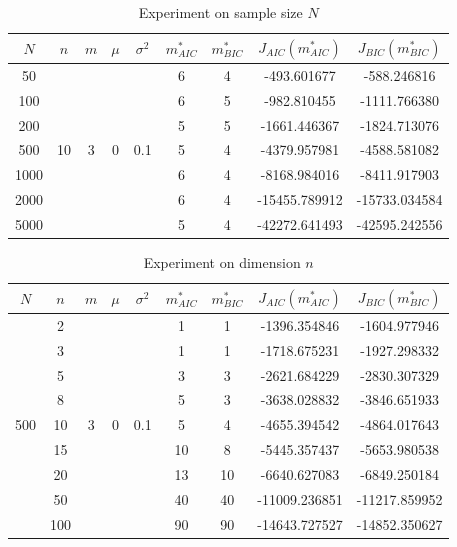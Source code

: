 \documentclass{article}
\begin{document}
\begin{table}[htbp]
	\centering
	\newcommand{\tabincell}[2]{\begin{tabular}{@{}#1@{}}#2\end{tabular}}
	\renewcommand\arraystretch{1.0}
	\caption{Experiment on sample size $N$}
	\label{N}%
	\begin{tabular}{c|c|c|c|c|c|c|c|c}
    $N$ & $n$ & $m$ & $\mu$ & $\sigma^2$ & $m^*_{AIC}$ & $m^*_{BIC}$ & $J_{AIC}(m^*_{AIC})$ &$J_{BIC}(m^*_{BIC})$\\
    \hline
		50 & \multirow{7}{*}{10} & \multirow{7}{*}{3} & \multirow{7}{*}{0} & \multirow{7}{*}{0.1} & 6 & 4 & -493.601677 & -588.246816\\
    100 & & & & & 6 & 5 & -982.810455 & -1111.766380\\
    200 & & & & & 5 & 5 & -1661.446367 & -1824.713076\\
    500 & & & & & 5 & 4 & -4379.957981 & -4588.581082\\
    1000 & & & & & 6 & 4 & -8168.984016 & -8411.917903\\
    2000 & & & & & 6 & 4 & -15455.789912 & -15733.034584\\
    5000 & & & & & 5 & 4 & -42272.641493 & -42595.242556\\
		\hline
\end{tabular}
\end{table}

\begin{table}[htbp]
	\centering
	\newcommand{\tabincell}[2]{\begin{tabular}{@{}#1@{}}#2\end{tabular}}
	\renewcommand\arraystretch{1.0}
	\caption{Experiment on dimension $n$}
	\label{n}%
	\begin{tabular}{c|c|c|c|c|c|c|c|c}
    $N$ & $n$ & $m$ & $\mu$ & $\sigma^2$ & $m^*_{AIC}$ & $m^*_{BIC}$ & $J_{AIC}(m^*_{AIC})$ &$J_{BIC}(m^*_{BIC})$\\
    \hline
		\multirow{9}{*}{500} & 2 & \multirow{9}{*}{3} & \multirow{9}{*}{0} & \multirow{9}{*}{0.1} & 1 & 1 & -1396.354846 & -1604.977946\\
     & 3 & & & & 1 & 1 & -1718.675231 & -1927.298332\\
     & 5 & & & & 3 & 3 & -2621.684229 & -2830.307329\\
     & 8 & & & & 5 & 3 & -3638.028832 & -3846.651933\\
     & 10 & & & & 5 & 4 & -4655.394542 & -4864.017643\\
     & 15 & & & & 10 & 8 & -5445.357437 & -5653.980538\\
     & 20 & & & & 13 & 10 & -6640.627083 & -6849.250184\\
     & 50 & & & & 40 & 40 & -11009.236851 & -11217.859952\\
     & 100 & & & & 90 & 90 & -14643.727527 & -14852.350627\\
		\hline
\end{tabular}
\end{table}
\end{document}
